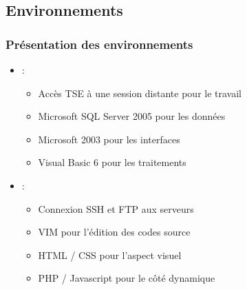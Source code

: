 \subsection{Environnements}

\begin{frame}
	\frametitle{Présentation des environnements}

	\begin{itemize}
		\item \solulog{} :
			\begin{itemize}
				\item Accès TSE à une session distante pour le travail\sautligne

				\item Microsoft SQL Server 2005 pour les données
				\item Microsoft  2003 pour les interfaces
				\item Visual Basic 6 pour les traitements\sautligne
			\end{itemize}
		\item \fidit{} :
			\begin{itemize}
				\item Connexion SSH et FTP aux serveurs
				\item VIM pour l'édition des codes source\sautligne

				\item HTML / CSS pour l'aspect visuel
				\item PHP / Javascript pour le côté dynamique
			\end{itemize}
	\end{itemize}
\end{frame}
